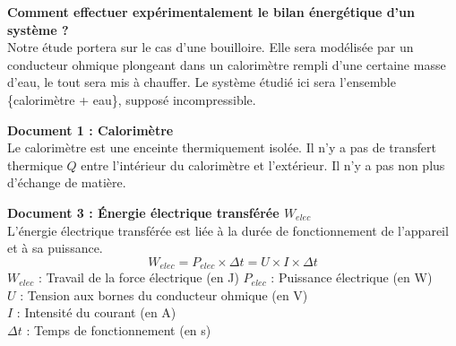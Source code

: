 \documentclass[a4paper,11pt,fleqn]{scrartcl}%
\begin{document}
	\maketitle

\textbf{Comment effectuer expérimentalement le bilan énergétique d'un système ?}\\
Notre étude portera sur le cas d'une bouilloire. Elle sera modélisée par un conducteur ohmique plongeant dans un calorimètre rempli d'une certaine masse d'eau, le tout sera mis à chauffer. Le système étudié ici sera l'ensemble \{calorimètre + eau\}, supposé incompressible.\\

\noindent \begin{minipage}{.48\linewidth} 
\begin{minipage}{\linewidth}
	\textbf{Document 1 : Calorimètre}\\
	Le calorimètre est une enceinte thermiquement isolée. Il n'y a pas de transfert thermique $Q$ entre l'intérieur du calorimètre et l'extérieur. Il n'y a pas non plus d'échange de matière.
\end{minipage}
\begin{minipage}{\linewidth}
	\textbf{Document 3 : Énergie électrique transférée $W_{elec}$}\\
	L'énergie électrique transférée est liée à la durée de fonctionnement de l'appareil et à sa puissance.\\
	$$W_{elec} = P_{elec} \times \Delta t = U \times I \times \Delta t$$
	$W_{elec}$ : Travail de la force électrique (en J)
	$P_{elec}$ : Puissance électrique (en W)\\
	$U$ : Tension aux bornes du conducteur ohmique (en V)\\
	$I$ : Intensité du courant (en A)\\
	$\Delta t$ : Temps de fonctionnement (en s)\\
\end{minipage}
\end{minipage}
\hspace{1em}
\end{document}
